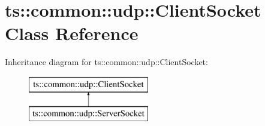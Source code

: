 \hypertarget{classts_1_1common_1_1udp_1_1_client_socket}{}\section{ts\+:\+:common\+:\+:udp\+:\+:Client\+Socket Class Reference}
\label{classts_1_1common_1_1udp_1_1_client_socket}
Inheritance diagram for ts\+:\+:common\+:\+:udp\+:\+:Client\+Socket\+:\begin{figure}[H]
\begin{center}
\leavevmode
\includegraphics[height=2.000000cm]{classts_1_1common_1_1udp_1_1_client_socket}
\end{center}
\end{figure}

